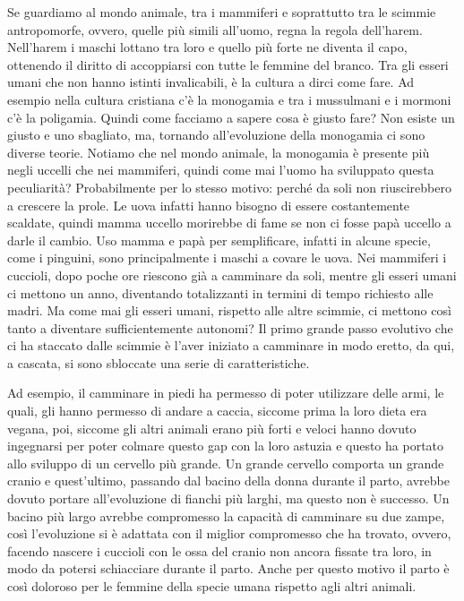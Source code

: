 \documentclass[12pt]{book} %
\begin{document}
\bigskip

Se guardiamo al mondo animale, tra i mammiferi e soprattutto tra le scimmie antropomorfe, ovvero, quelle più simili
all'uomo, regna la regola dell'harem. Nell'harem i
maschi lottano tra loro e quello più forte ne diventa il capo, ottenendo il diritto di accoppiarsi con tutte le femmine
del branco. Tra gli esseri umani che non hanno istinti invalicabili, è la cultura a dirci come fare. Ad
esempio nella cultura cristiana c'è la monogamia e tra i mussulmani e i mormoni c'è la poligamia. Quindi come facciamo a sapere
cosa è giusto fare? Non esiste un giusto e uno sbagliato, ma, tornando all'evoluzione
della monogamia ci sono diverse teorie. Notiamo che nel mondo animale, la monogamia è presente più negli uccelli che
nei mammiferi, quindi come mai l'uomo ha sviluppato questa peculiarità? Probabilmente per lo
stesso motivo: perché da soli non riuscirebbero a crescere la prole. Le uova infatti hanno bisogno di essere costantemente scaldate, quindi
mamma uccello morirebbe di fame se non ci fosse papà uccello a darle il cambio. Uso mamma e papà per semplificare,
infatti in alcune specie, come i pinguini, sono principalmente i maschi a covare le uova. Nei mammiferi i cuccioli,
dopo poche ore riescono già a camminare da soli, mentre gli esseri umani ci mettono un anno, diventando totalizzanti in
termini di tempo richiesto alle madri. Ma come mai gli esseri umani, rispetto alle altre scimmie, ci mettono così tanto
a diventare sufficientemente autonomi? Il primo grande passo evolutivo che ci ha staccato dalle scimmie è
l'aver iniziato a camminare in modo eretto, da qui, a cascata, si sono sbloccate una serie di
caratteristiche. 

Ad esempio, il camminare in piedi ha permesso di poter utilizzare delle armi, le quali, gli hanno permesso di andare a
caccia, siccome prima la loro dieta era vegana, poi, siccome gli altri animali erano più forti e veloci hanno dovuto
ingegnarsi per poter colmare questo gap con la loro astuzia e questo ha portato allo sviluppo di un cervello più grande.
Un grande cervello comporta un grande cranio e quest'ultimo,
passando dal bacino della donna durante il parto, avrebbe dovuto portare all'evoluzione di fianchi
più larghi, ma questo non è successo. Un bacino più largo avrebbe compromesso la capacità di camminare su due zampe,
così l'evoluzione si è adattata con il miglior compromesso che ha trovato, ovvero, facendo nascere
i cuccioli con le ossa del cranio non ancora fissate tra loro, in modo da potersi schiacciare durante il parto. Anche
per questo motivo il parto è così doloroso per le femmine della specie umana rispetto agli altri animali. 
\end{document}
